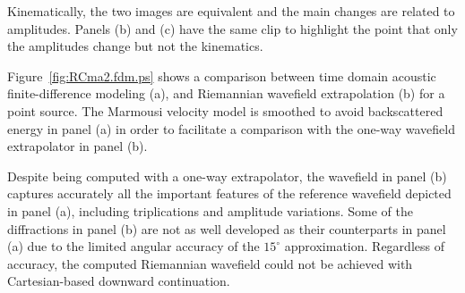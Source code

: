 Kinematically, the two images are equivalent and the main changes
are related to amplitudes.
Panels (b) and (c) have the same clip to highlight the point that
only the amplitudes change but not the kinematics.
\par
Figure~\ref{fig:RCma2.fdm.ps} shows a comparison between 
time domain acoustic finite-difference modeling (a), and
Riemannian wavefield extrapolation (b) for a point
source. The Marmousi velocity model is smoothed to avoid
backscattered energy in panel (a) in order to facilitate
a comparison with the one-way wavefield extrapolator in 
panel (b).
\par
Despite being computed with a one-way extrapolator,
the wavefield in panel (b) captures accurately all the
important features of the reference wavefield
depicted in panel (a), including triplications and
amplitude variations. 
Some of the diffractions in panel
(b) are not as well developed as their counterparts in 
panel (a) due to the limited angular accuracy of the
$15^\circ$ approximation.
Regardless of accuracy, the computed
Riemannian wavefield could not be achieved
with Cartesian-based downward continuation.
